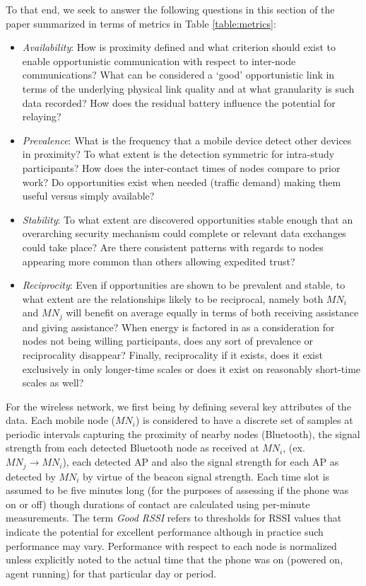 To that end, we seek to answer the following questions in this section of the paper summarized in terms of metrics in Table \ref{table:metrics}:

\begin{itemize}
	\item \emph{Availability}: How is proximity defined and what criterion should exist to enable opportunistic communication with respect to inter-node communications?  What can be considered a `good' opportunistic link in terms of the underlying physical link quality and at what granularity is such data recorded? How does the residual battery influence the potential for relaying? 
	\item \emph{Prevalence}: What is the frequency that a mobile device detect other devices in proximity?  To what extent is the detection symmetric for intra-study participants?  How does the inter-contact times of nodes compare to prior work?  Do opportunities exist when needed (traffic demand) making them useful versus simply available?  
	\item \emph{Stability}: To what extent are discovered opportunities stable enough that an overarching security mechanism could complete or relevant data exchanges could take place?  Are there consistent patterns with regards to nodes appearing more common than others allowing expedited trust?   
	\item \emph{Reciprocity}: Even if opportunities are shown to be prevalent and stable, to what extent are the relationships likely to be reciprocal, namely both $MN_i$ and $MN_j$ will benefit on average equally in terms of both receiving assistance and giving assistance?  When energy is factored in as a consideration for nodes not being willing participants, does any sort of prevalence or reciprocality disappear?  Finally, reciprocality if it exists, does it exist exclusively in only longer-time scales or does it exist on reasonably short-time scales as well?    
\end{itemize}

For the wireless network, we first being by defining several key attributes of the data.  Each mobile node ($MN_i$) is considered to have a discrete set of samples at periodic intervals capturing the proximity of nearby nodes (Bluetooth), the signal strength from each detected Bluetooth node as received at $MN_i$, (ex. $MN_j \rightarrow MN_i$), each detected AP and also the signal strength for each AP as detected by $MN_i$ by virtue of the beacon signal strength.  Each time slot is assumed to be five minutes long (for the purposes of assessing if the phone was on or off) though durations of contact are calculated using per-minute measurements.  The term \emph{Good RSSI} refers to thresholds for RSSI values that indicate the potential for excellent performance although in practice such performance may vary.  Performance with respect to each node is normalized unless explicitly noted to the actual time that the phone was on (powered on, agent running) for that particular day or period. 

